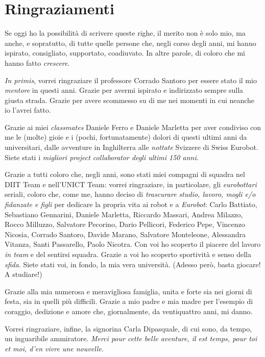 \chapter*{Ringraziamenti}
%
Se oggi ho la possibilit\`a di scrivere queste righe, il merito non \`e solo mio, 
ma anche, e sopratutto, di tutte quelle persone che, negli corso degli anni, mi hanno 
ispirato, consigliato, supportato, coadiuvato. In altre parole, di coloro che mi hanno fatto 
\emph{crescere}.
%

%
\emph{In primis}, vorrei ringraziare il professore Corrado Santoro per essere stato il 
mio \emph{mentore} in questi anni. Grazie per avermi ispirato e indirizzato
sempre sulla giusta strada. Grazie per avere scommesso su di me nei momenti in cui 
neanche io l'avrei fatto.
%

%
Grazie ai miei \emph{classmates} Daniele Ferro e Daniele Marletta per aver condiviso 
con me le (molte) gioie e i (pochi, fortunatamente) dolori di questi ultimi anni da 
universitari, dalle avventure in Inghilterra alle \emph{nottate} Svizzere di Swiss Eurobot.
Siete stati i \emph{migliori project collaborator degli ultimi 150 anni}.
%

%
Grazie a tutti coloro che, negli anni, sono stati miei compagni di squadra nel DIIT Team 
e nell'UNICT Team: vorrei ringraziare, in particolare, gli \emph{eurobottari} seriali, 
coloro che, come me, hanno deciso di \emph{trascurare studio, lavoro, mogli e/o fidanzate e figli} 
per dedicare la propria vita ai robot 
e a \emph{Eurobot}: Carlo Battiato, Sebastiano Gennarini, Daniele Marletta, Riccardo Massari, 
Andrea Milazzo, Rocco Milluzzo, Salvatore Pecorino, Dario Pellicori, Federico Pepe, 
Vincenzo Nicosia, Corrado Santoro, Davide Marano, Salvatore Monteleone, Alessandra Vitanza, 
Santi Passarello, Paolo Nicotra.
%
Con voi ho scoperto il piacere del lavoro \emph{in team} e del sentirsi squadra.
Grazie a voi ho scoperto sportivit\`a e senso della \emph{sfida}.
Siete stati voi, in fondo, la mia vera universit\`a.
(Adesso per\`o, basta giocare! A studiare!)
%

%
Grazie alla mia numerosa e meravigliosa famiglia, unita e forte sia nei giorni di festa, sia in 
quelli pi\`u difficili. Grazie a mio padre e mia madre per l'esempio di coraggio, dedizione e 
amore che, giornalmente, da ventiquattro anni, mi danno.
%

%
Vorrei ringraziare, infine, la signorina Carla Dipasquale, di cui sono, da tempo, un 
inguaribile ammiratore.
%
\emph{Merci pour cette belle aventure, il est temps, pour toi et moi, d'en vivre une nouvelle.}
